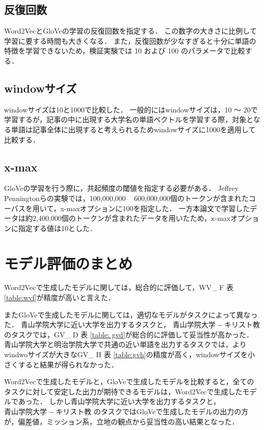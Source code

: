 \subsection{反復回数}
Word2VecとGloVeの学習の反復回数を指定する．
この数字の大きさに比例して学習に要する時間も大きくなる．
また，反復回数が少なすぎると十分に単語の特徴を学習できないため，検証実験では 10 および 100 のパラメータで比較する．

\subsection{windowサイズ}
windowサイズは10と1000で比較した．
一般的にはwindowサイズは，10 〜 20で学習するが，記事の中に出現する大学名の単語ベクトルを学習する際，対象となる単語は記事全体に出現すると考えられるためwindowサイズに1000を適用して比較する．

\subsection{x-max}
GloVeの学習を行う際に，共起頻度の閾値を指定する必要がある．
Jeffrey Penningtonらの実験では，100,000,000 ~ 600,000,000個のトークンが含まれたコーパスを用いて，x-maxオプションに100を指定した．
一方本論文で学習したデータは約2,400,000個のトークンが含まれたデータを用いたため，x-maxオプションに指定する値は10とした．










\section{モデル評価のまとめ}
Word2Vecで生成したモデルに関しては，総合的に評価して，WV\_ F 表 \ref{table:wvf}が精度が高いと言えた．

またGloVeで生成したモデルに関しては，適切なモデルがタスクによって異なった．
青山学院大学に近い大学を出力するタスクと， $ 青山学院大学 - キリスト教 $ のタスクでは，GV\_ D 表 \ref{table: gvd}が総合的に評価して妥当性が高かった．
青山学院大学と明治学院大学で共通の近い単語を出力するタスクでは，よりwindwoサイズが大きなGV\_ H 表 \ref{table:gvh}の精度が高く，windowサイズを小さくすると結果が得られなかった．

Word2Vecで生成したモデルと，GloVeで生成したモデルを比較すると，全てのタスクに対して安定した出力が期待できるモデルは，Word2Vecで生成したモデルであった．
しかし青山学院大学に近い大学を出力するタスクと， $ 青山学院大学 - キリスト教 $ のタスクではGloVeで生成したモデルの出力の方が，偏差値，ミッション系，立地の観点から妥当性の高い結果となった．
